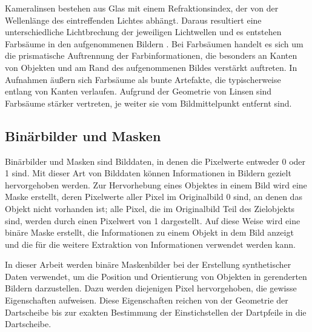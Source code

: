 Kameralinsen bestehen aus Glas mit einem Refraktionsindex, der von der Wellenlänge des eintreffenden Lichtes abhängt. Daraus resultiert eine unterschiedliche Lichtbrechung der jeweiligen Lichtwellen und es entstehen Farbsäume in den aufgenommenen Bildern \cite{lens_distortion, camera_everything}. Bei Farbsäumen handelt es sich um die prismatische Auftrennung der Farbinformationen, die besonders an Kanten von Objekten und am Rand des aufgenommenen Bildes verstärkt auftreten. In Aufnahmen äußern sich Farbsäume als bunte Artefakte, die typischerweise entlang von Kanten verlaufen. Aufgrund der Geometrie von Linsen sind Farbsäume stärker vertreten, je weiter sie vom Bildmittelpunkt entfernt sind.


\subsection{Binärbilder und Masken}
\label{sec:masken}

Binärbilder und Masken sind Bilddaten, in denen die Pixelwerte entweder 0 oder 1 sind. Mit dieser Art von Bilddaten können Informationen in Bildern gezielt hervorgehoben werden. Zur Hervorhebung eines Objektes in einem Bild wird eine Maske erstellt, deren Pixelwerte aller Pixel im Originalbild 0 sind, an denen das Objekt nicht vorhanden ist; alle Pixel, die im Originalbild Teil des Zielobjekts sind, werden durch einen Pixelwert von 1 dargestellt. Auf diese Weise wird eine binäre Maske erstellt, die Informationen zu einem Objekt in dem Bild anzeigt und die für die weitere Extraktion von Informationen verwendet werden kann.

In dieser Arbeit werden binäre Maskenbilder bei der Erstellung synthetischer Daten verwendet, um die Position und Orientierung von Objekten in gerenderten Bildern darzustellen. Dazu werden diejenigen Pixel hervorgehoben, die gewisse Eigenschaften aufweisen. Diese Eigenschaften reichen von der Geometrie der Dartscheibe bis zur exakten Bestimmung der Einstichstellen der Dartpfeile in die Dartscheibe.

